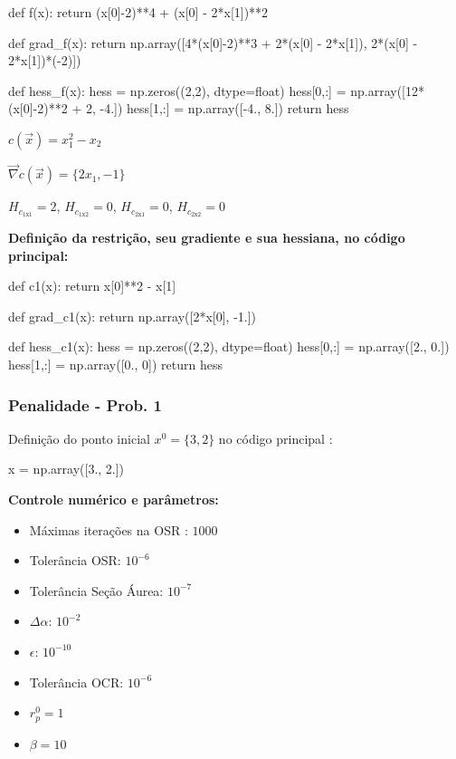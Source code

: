 \documentclass[10pt, a4paper]{article}
\begin{document}
\begin{python}
  def f(x):
      return (x[0]-2)**4 + (x[0] - 2*x[1])**2

  def grad_f(x):
      return np.array([4*(x[0]-2)**3 + 2*(x[0] - 2*x[1]), 2*(x[0] - 2*x[1])*(-2)])

  def hess_f(x):
      hess = np.zeros((2,2), dtype=float)
      hess[0,:] = np.array([12*(x[0]-2)**2 + 2, -4.])
      hess[1,:] = np.array([-4., 8.])
      return hess
\end{python}

\vspace{3mm}
$c(\overrightarrow{x}) = x_1^2 - x_2$

\vspace{2mm}
$\overrightarrow{\nabla} c (\overrightarrow{x}) = \{2x_1, -1\}$

\vspace{2mm}
$H_{c_{1\text{x}1}} = 2$, \hspace{4mm}
$H_{c_{1\text{x}2}} = 0$, \hspace{4mm}
$H_{c_{2\text{x}1}} = 0$, \hspace{4mm}
$H_{c_{2\text{x}2}} = 0$

\vspace{3mm}
\textbf{Definição da restrição, seu gradiente e sua hessiana, no código principal:}

\begin{python}
  def c1(x):
      return x[0]**2 - x[1]

  def grad_c1(x):
      return np.array([2*x[0], -1.])

  def hess_c1(x):
      hess = np.zeros((2,2), dtype=float)
      hess[0,:] = np.array([2., 0.])
      hess[1,:] = np.array([0., 0])
      return hess
\end{python}

\subsubsection{Penalidade - Prob. 1}

Definição do ponto inicial $x^0 = \{3,2\}$ no código principal :

\begin{python}
  x = np.array([3., 2.])
\end{python}

\vspace{3mm}
\textbf{Controle numérico e parâmetros:}

\begin{itemize}
  \item Máximas iterações na OSR : $1000$
  \item Tolerância OSR: $10^{-6}$
  \item Tolerância Seção Áurea: $10^{-7}$
  \item $\Delta \alpha$: $10^{-2}$
  \item $\epsilon$: $10^{-10}$
  \item Tolerância OCR: $10^{-6}$
  \item $r_p^0 = 1$
  \item $\beta = 10$
\end{itemize}
\end{document}
